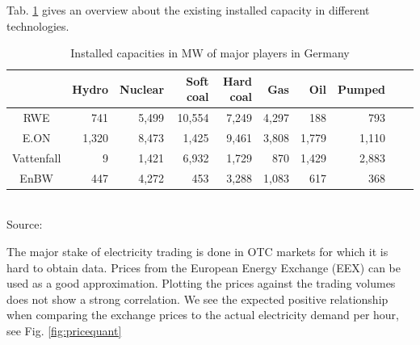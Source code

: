 Tab. \ref{tab:majorcapacities} gives an overview about the existing installed capacity in different technologies.

\begin{table}[htb]
\centering
\scriptsize
\caption{Installed capacities in MW of major players in Germany}
\vspace{0.3cm}
\begin{tabular}[htb]{crrrrrrrrr}
\hline
           &      Hydro &    Nuclear &  Soft coal &  Hard coal &        Gas &        Oil &     Pumped \\
\hline\hline
       RWE &        741 &       5,499 &      10,554 &       7,249 &       4,297 &        188 &        793 \\

      E.ON &       1,320 &       8,473 &       1,425 &       9,461 &       3,808 &       1,779 &       1,110 \\

Vattenfall &          9 &       1,421 &       6,932 &       1,729 &        870 &       1,429 &       2,883 \\

      EnBW &        447 &       4,272 &        453 &       3,288 &       1,083 &        617 &        368 \\
\hline
\end{tabular} 
\label{tab:majorcapacities}
\\
\vspace{0.3cm}
\scriptsize Source: \cite{Ellersdorfer2005}
\end{table}



The major stake of electricity trading is done in OTC markets for which it is hard to obtain data. Prices from the European Energy Exchange (EEX) can be used as a good approximation. Plotting the prices against the trading volumes does not show a strong correlation. We see the expected positive relationship when comparing the exchange prices to the actual electricity demand per hour, see Fig. \ref{fig:pricequant}

